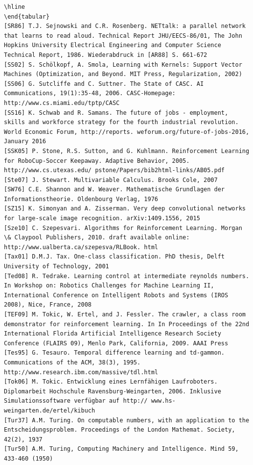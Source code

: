 \documentclass[10pt]{article}
\begin{document}
\begin{verbatim}
\hline
\end{tabular}
[SR86] T.J. Sejnowski and C.R. Rosenberg. NETtalk: a parallel network that learns to read aloud. Technical Report JHU/EECS-86/01, The John Hopkins University Electrical Engineering and Computer Science Technical Report, 1986. Wiederabdruck in [AR88] S. 661-672
[SS02] S. Schölkopf, A. Smola, Learning with Kernels: Support Vector Machines (Optimization, and Beyond. MIT Press, Regularization, 2002)
[SS06] G. Sutcliffe and C. Suttner. The State of CASC. AI Communications, 19(1):35-48, 2006. CASC-Homepage: http://www.cs.miami.edu/tptp/CASC
[SS16] K. Schwab and R. Samans. The future of jobs - employment, skills and workforce strategy for the fourth industrial revolution. World Economic Forum, http://reports. weforum.org/future-of-jobs-2016, January 2016
[SSK05] P. Stone, R.S. Sutton, and G. Kuhlmann. Reinforcement Learning for RoboCup-Soccer Keepaway. Adaptive Behavior, 2005. http://www.cs.utexas.edu/ pstone/Papers/bib2html-links/AB05.pdf
[Ste07] J. Stewart. Multivariable Calculus. Brooks Cole, 2007
[SW76] C.E. Shannon and W. Weaver. Mathematische Grundlagen der Informationstheorie. Oldenbourg Verlag, 1976
[SZ15] K. Simonyan and A. Zisserman. Very deep convolutional networks for large-scale image recognition. arXiv:1409.1556, 2015
[Sze10] C. Szepesvari. Algorithms for Reinforcement Learning. Morgan \& Claypool Publishers, 2010. draft available online: http://www.ualberta.ca/szepesva/RLBook. html
[Tax01] D.M.J. Tax. One-class classification. PhD thesis, Delft University of Technology, 2001
[Ted08] R. Tedrake. Learning control at intermediate reynolds numbers. In Workshop on: Robotics Challenges for Machine Learning II, International Conference on Intelligent Robots and Systems (IROS 2008), Nice, France, 2008
[TEF09] M. Tokic, W. Ertel, and J. Fessler. The crawler, a class room demonstrator for reinforcement learning. In In Proceedings of the 22nd International Florida Artificial Intelligence Research Society Conference (FLAIRS 09), Menlo Park, California, 2009. AAAI Press
[Tes95] G. Tesauro. Temporal difference learning and td-gammon. Communications of the ACM, 38(3), 1995. http://www.research.ibm.com/massive/tdl.html
[Tok06] M. Tokic. Entwicklung eines Lernfähigen Laufroboters. Diplomarbeit Hochschule Ravensburg-Weingarten, 2006. Inklusive Simulationssoftware verfügbar auf http:// www.hs-weingarten.de/ertel/kibuch
[Tur37] A.M. Turing. On computable numbers, with an application to the Entscheidungsproblem. Proceedings of the London Mathemat. Society, 42(2), 1937
[Tur50] A.M. Turing, Computing Machinery and Intelligence. Mind 59, 433-460 (1950)

\end{verbatim}
\end{document}
